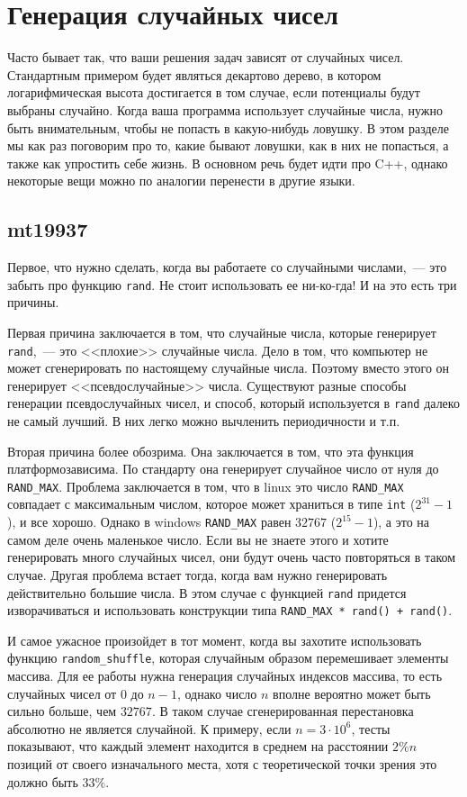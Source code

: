\chapter{Генерация случайных чисел} \label{randomsection}

Часто бывает так, что ваши решения задач зависят от случайных чисел. Стандартным примером будет являться декартово дерево, в котором логарифмическая высота достигается в том случае, если потенциалы будут выбраны случайно. Когда ваша программа использует случайные числа, нужно быть внимательным, чтобы не попасть в какую-нибудь ловушку. В этом разделе мы как раз поговорим про то, какие бывают ловушки, как в них не попасться, а также как упростить себе жизнь. В основном речь будет идти про C++, однако некоторые вещи можно по аналогии перенести в другие языки.

\section{mt19937}

Первое, что нужно сделать, когда вы работаете со случайными числами,~--- это забыть про функцию \verb+rand+. Не стоит использовать ее ни-ко-гда! И на это есть три причины.

Первая причина заключается в том, что случайные числа, которые генерирует \verb+rand+,~--- это <<плохие>> случайные числа. Дело в том, что компьютер не может сгенерировать по настоящему случайные числа. Поэтому вместо этого он генерирует <<псевдослучайные>> числа. Существуют разные способы генерации псевдослучайных чисел, и способ, который используется в \verb+rand+ далеко не самый лучший. В них легко можно вычленить периодичности и т.п.

Вторая причина более обозрима. Она заключается в том, что эта функция платформозависима. По стандарту она генерирует случайное число от нуля до \verb+RAND_MAX+. Проблема заключается в том, что в linux это число \verb+RAND_MAX+ совпадает с максимальным числом, которое может храниться в типе \verb+int+ ($2^{31} - 1$), и все хорошо. Однако в windows \verb+RAND_MAX+ равен $32767$ ($2^{15} - 1$), а это на самом деле очень маленькое число. Если вы не знаете этого и хотите генерировать много случайных чисел, они будут очень часто повторяться в таком случае. Другая проблема встает тогда, когда вам нужно генерировать действительно большие числа. В этом случае с функцией \verb+rand+ придется изворачиваться и использовать конструкции типа \verb^RAND_MAX * rand() + rand()^.

И самое ужасное произойдет в тот момент, когда вы захотите использовать функцию \verb+random_shuffle+, которая случайным образом перемешивает элементы массива. Для ее работы нужна генерация случайных индексов массива, то есть случайных чисел от $0$ до $n - 1$, однако число $n$ вполне вероятно может быть сильно больше, чем $32767$. В таком случае сгенерированная перестановка абсолютно не является случайной. К примеру, если $n = 3 \cdot 10^6$, тесты показывают, что каждый элемент находится в среднем на расстоянии $2 \% n$ позиций от своего изначального места, хотя с теоретической точки зрения это должно быть $33 \%$.

